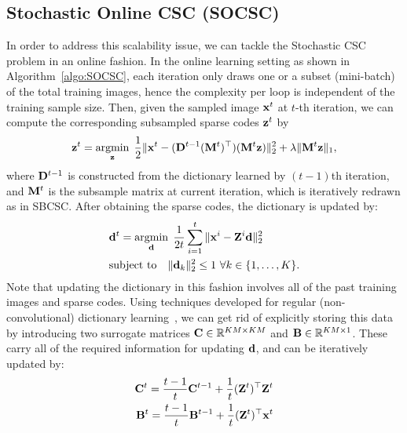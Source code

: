 \subsection{Stochastic Online CSC (SOCSC)}
In order to address this scalability issue, we can tackle the
Stochastic CSC problem in an online fashion. In the online learning
setting as shown in Algorithm~\ref{algo:SOCSC}, each iteration only
draws one or a subset (mini-batch) of the total training images, hence
the complexity per loop is independent of the training sample
size. Then, given the sampled image $\signal^t$ at $t$-th iteration,
we can compute the corresponding subsampled sparse codes $\code^t$ by
\begin{equation} \label{eq:updatingCodeOnline}
    \code^t = \minimize{\code} \frac{1}{2}\|\signal^t - (\Filter^{t-1} (\mask^t)^\top)(\mask^t \code) \|_2^2 + \lambda \|\mask^t \code\|_1,
\end{equation}
where $\Filter^{t-1}$ is constructed from the dictionary learned by
$(t-1)$th iteration, and $\mask^t$ is the subsample matrix at current
iteration, which is iteratively redrawn as in SBCSC. After obtaining
the sparse codes, the dictionary is updated by:
\begin{equation}
\begin{split}
    &\filter^t = \minimize{\filter} \frac{1}{2t}\sum_{i=1}^{t} \|\signal^i - \Code^i \filter \|_2^2 \\
    &\text{subject to} \quad \|\filter_k\|^2_2 \leq 1 ~ \forall k \in \{1,\dots,K\}.
\end{split}
\end{equation}
Note that updating the dictionary in this fashion involves all of the
past training images and sparse codes. Using techniques developed for
regular (non-convolutional) dictionary
learning~\cite{mairal2009online,mairal2010online}, we can get rid of
explicitly storing this data by introducing two surrogate matrices
$\surC \in \mathbb{R}^{KM \times KM}$ and $\surB \in \mathbb{R}^{KM
  \times 1}$. These carry all of the required information for updating
$\filter$, and can be iteratively updated by:
\begin{equation} \label{eq:updateSur}
\begin{split}
    \surC^t  = \frac{t-1}{t} \surC^{t-1} + \frac{1}{t}(\Code^t)^\top \Code^t \\
    \surB^t  = \frac{t-1}{t} \surB^{t-1} + \frac{1}{t}(\Code^t)^\top \signal^t
\end{split}
\end{equation}
